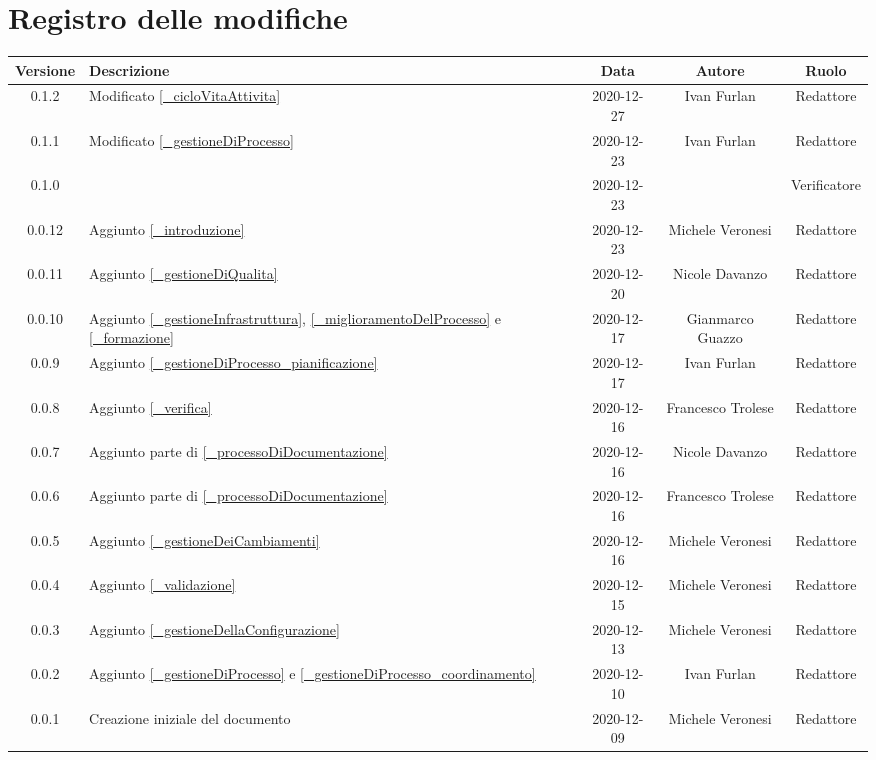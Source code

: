 \section*{Registro delle modifiche}

\begin{center}
	\begin{longtable}{|c|p{5cm}|c|c|c|}
		\hline
		\rowcolor{lighter-grayer}
		\textbf{Versione} & \textbf{Descrizione} & \textbf{Data} & \textbf{Autore} & \textbf{Ruolo} \\
		\hline
		\endfirsthead


		0.1.2 & Modificato \ref{_cicloVitaAttivita} & 2020-12-27& Ivan Furlan & Redattore \\
		0.1.1 & Modificato \ref{_gestioneDiProcesso} & 2020-12-23 & Ivan Furlan & Redattore \\
		0.1.0 &  & 2020-12-23 &  & Verificatore \\
		0.0.12 & Aggiunto \ref{_introduzione} & 2020-12-23 & Michele Veronesi & Redattore \\
		0.0.11 & Aggiunto \ref{_gestioneDiQualita} & 2020-12-20 & Nicole Davanzo & Redattore \\
		0.0.10 & Aggiunto \ref{_gestioneInfrastruttura}, \ref{_miglioramentoDelProcesso} e \ref{_formazione} & 2020-12-17 & Gianmarco Guazzo & Redattore \\
		0.0.9 & Aggiunto \ref{_gestioneDiProcesso_pianificazione} & 2020-12-17 & Ivan Furlan & Redattore \\
		0.0.8 & Aggiunto \ref{_verifica} & 2020-12-16 & Francesco Trolese & Redattore \\
		0.0.7 & Aggiunto parte di \ref{_processoDiDocumentazione} & 2020-12-16 & Nicole Davanzo & Redattore \\
		0.0.6 & Aggiunto parte di \ref{_processoDiDocumentazione} & 2020-12-16 & Francesco Trolese & Redattore \\
		0.0.5 & Aggiunto \ref{_gestioneDeiCambiamenti} & 2020-12-16 & Michele Veronesi & Redattore \\
		0.0.4 & Aggiunto \ref{_validazione} & 2020-12-15 & Michele Veronesi & Redattore \\
		0.0.3 & Aggiunto \ref{_gestioneDellaConfigurazione} & 2020-12-13 & Michele Veronesi & Redattore \\
		0.0.2 & Aggiunto \ref{_gestioneDiProcesso} e \ref{_gestioneDiProcesso_coordinamento} & 2020-12-10 & Ivan Furlan & Redattore \\
		0.0.1 & Creazione iniziale del documento & 2020-12-09 & Michele Veronesi & Redattore \\
		
		\hline
	\end{longtable}
\end{center}